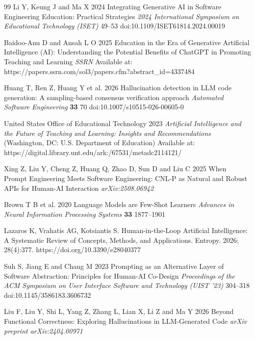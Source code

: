 \documentclass{iopjournal}
\begin{document}
\begin{thebibliography}{99}
Li Y, Keung J and Ma X 2024 Integrating Generative AI in Software Engineering Education: Practical Strategies \textit{2024 International Symposium on Educational Technology (ISET)} 49--53 doi:10.1109/ISET61814.2024.00019

Baidoo-Anu D and Ansah L O 2025 Education in the Era of Generative Artificial Intelligence (AI): Understanding the Potential Benefits of ChatGPT in Promoting Teaching and Learning \textit{SSRN} Available at: https://papers.ssrn.com/sol3/papers.cfm?abstract\_id=4337484

Huang T, Ren Z, Huang Y et al. 2026 Hallucination detection in LLM code generation: A sampling-based consensus verification approach \textit{Automated Software Engineering} \textbf{33} 70 doi:10.1007/s10515-026-00605-0

United States Office of Educational Technology 2023 \textit{Artificial Intelligence and the Future of Teaching and Learning: Insights and Recommendations} (Washington, DC: U.S. Department of Education) Available at: https://digital.library.unt.edu/ark:/67531/metadc2114121/

Xing Z, Liu Y, Cheng Z, Huang Q, Zhao D, Sun D and Liu C 2025 When Prompt Engineering Meets Software Engineering: CNL-P as Natural and Robust APIs for Human-AI Interaction \textit{arXiv:2508.06942}

Brown T B et al. 2020 Language Models are Few-Shot Learners \textit{Advances in Neural Information Processing Systems} \textbf{33} 1877--1901

Lazaros K, Vrahatis AG, Kotsiantis S. Human-in-the-Loop Artificial Intelligence: A Systematic Review of Concepts, Methods, and Applications. Entropy. 2026; 28(4):377. https://doi.org/10.3390/e28040377

Suh S, Jiang E and Chang M 2023 Prompting as an Alternative Layer of Software Abstraction: Principles for Human-AI Co-Design \textit{Proceedings of the ACM Symposium on User Interface Software and Technology (UIST '23)} 304--318 doi:10.1145/3586183.3606732

Liu F, Liu Y, Shi L, Yang Z, Zhang L, Lian X, Li Z and Ma Y 2026 Beyond Functional Correctness: Exploring Hallucinations in LLM-Generated Code \textit{arXiv preprint arXiv:2404.00971}

\end{thebibliography}
\end{document}

